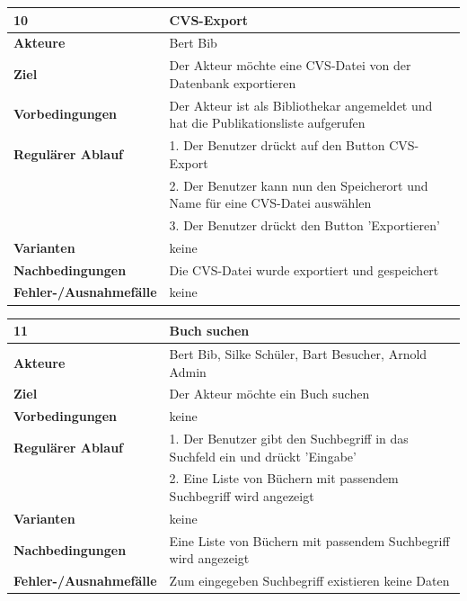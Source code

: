 \documentclass[fontsize=12pt,paper=a4,twoside]{scrartcl}
\begin{document}
\newpage
\begin{table}[htbp]
\label{10}
\begin{tabular}{|l|p{10cm}|}
\hline 
\textbf{10} & \textbf{CVS-Export} \\ \hline
\textbf{Akteure} & Bert Bib\\ \hline
\textbf{Ziel} & Der Akteur möchte eine CVS-Datei von der Datenbank exportieren \\ \hline
\textbf{Vorbedingungen} & Der Akteur ist als Bibliothekar angemeldet und hat die Publikationsliste 
aufgerufen \\ \hline
\textbf{Regulärer Ablauf} & 
1. Der Benutzer drückt auf den Button CVS-Export \\
&2. Der Benutzer kann nun den Speicherort und Name für eine CVS-Datei auswählen\\
&3. Der Benutzer drückt den Button 'Exportieren'\\
\hline
\textbf{Varianten} & 
keine \\ \hline
\textbf{Nachbedingungen} & Die CVS-Datei wurde exportiert und gespeichert\\ \hline
\textbf{Fehler-/Ausnahmefälle} & keine\\
\hline
\end{tabular}
\end{table}

\newpage
\begin{table}[htbp]
\label{11}
\begin{tabular}{|l|p{10cm}|}
\hline 
\textbf{11} & \textbf{Buch suchen} \\ \hline
\textbf{Akteure} & Bert Bib, Silke Schüler, Bart Besucher, Arnold Admin\\ \hline
\textbf{Ziel} & Der Akteur möchte ein Buch suchen \\ \hline
\textbf{Vorbedingungen} & keine \\ \hline
\textbf{Regulärer Ablauf} & 
1. Der Benutzer gibt den Suchbegriff in das Suchfeld ein und drückt 'Eingabe' \\
&2. Eine Liste von Büchern mit passendem Suchbegriff wird angezeigt\\
\hline
\textbf{Varianten} & 
keine \\ \hline
\textbf{Nachbedingungen} & Eine Liste von Büchern mit passendem Suchbegriff wird angezeigt\\ \hline
\textbf{Fehler-/Ausnahmefälle} & Zum eingegeben Suchbegriff existieren keine Daten\\
\hline
\end{tabular}
\end{table}
\end{document}
